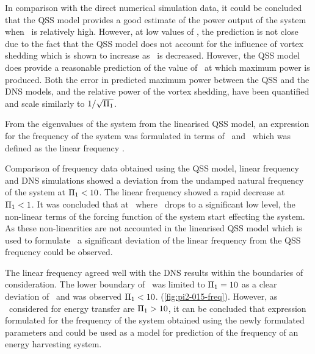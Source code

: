 In comparison with the direct numerical simulation data, it could be concluded that the QSS model provides a good estimate of the power output of the system when \massstiff\ is relatively high. However, at low values of \massstiff, the prediction is not close due to the fact that the QSS model does not account for the influence of vortex shedding which is shown to increase as \massstiff\ is decreased. However, the QSS model does provide a reasonable prediction of the value of \massdamp\ at which maximum power is produced. Both the error in predicted maximum power between the QSS and the DNS models, and the relative power of the vortex shedding, have been quantified and scale similarly to $1/\sqrt{\Pi_1}$.

From the eigenvalues of the system from the linearised QSS model, an expression for the frequency of the system was formulated in terms of \massstiff\ and \massdamp\ which was defined as the linear frequency \freqlin.

Comparison of frequency data obtained using the QSS model, linear frequency and DNS simulations showed a deviation from the undamped natural frequency of the system at $\Pi_1<10$. The linear frequency showed a rapid decrease at $\Pi_1<1$. It was concluded that at \massstiff\, where \massstiff\ drops to a significant low level, the non-linear terms of the forcing function of the system start effecting the system. As these non-linearities are not accounted in the linearised QSS model which is used to formulate \freqlin\ a significant deviation of the linear frequency from the QSS frequency could be observed.

The linear frequency agreed well with the DNS results within the boundaries of consideration. The lower boundary of \massstiff\ was limited to $\Pi_1=10$ as a clear deviation of \freqlin\ and \freqdns was observed $\Pi_1<10$. (\ref{fig:pi2-015-freq}). However, as \massstiff\ considered for energy transfer are $\Pi_1>10$, it can be concluded that expression formulated for the frequency of the system obtained using the newly formulated parameters \massstiff and \massdamp could be used as a model for prediction of the frequency of an energy harvesting system.  
 
 









